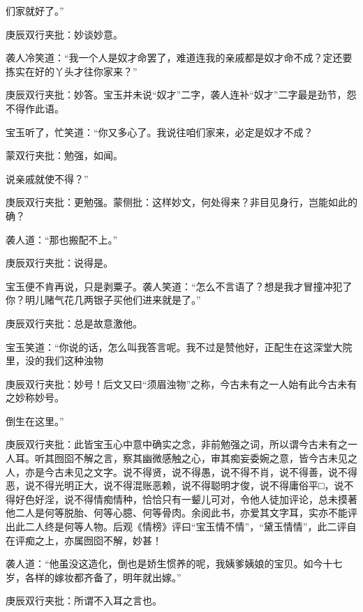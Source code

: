 \begin{parag}
们家就好了。”\begin{note}庚辰双行夹批：妙谈妙意。\end{note}袭人冷笑道：“我一个人是奴才命罢了，难道连我的亲戚都是奴才命不成？定还要拣实在好的丫头才往你家来？”\begin{note}庚辰双行夹批：妙答。宝玉并未说“奴才”二字，袭人连补“奴才”二字最是劲节，怨不得作此语。\end{note}宝玉听了，忙笑道：“你又多心了。我说往咱们家来，必定是奴才不成？\begin{note}蒙双行夹批：勉强，如闻。\end{note}说亲戚就使不得？”\begin{note}庚辰双行夹批：更勉强。蒙侧批：这样妙文，何处得来？非目见身行，岂能如此的确？\end{note}袭人道：“那也搬配不上。”\begin{note}庚辰双行夹批：说得是。\end{note}宝玉便不肯再说，只是剥粟子。袭人笑道：“怎么不言语了？想是我才冒撞冲犯了你？明儿赌气花几两银子买他们进来就是了。”\begin{note}庚辰双行夹批：总是故意激他。\end{note}宝玉笑道：“你说的话，怎么叫我答言呢。我不过是赞他好，正配生在这深堂大院里，没的我们这种浊物\begin{note}庚辰双行夹批：妙号！后文又曰“须眉浊物”之称，今古未有之一人始有此今古未有之妙称妙号。\end{note}倒生在这里。”\begin{note}庚辰双行夹批：此皆宝玉心中意中确实之念，非前勉强之词，所以谓今古未有之一人耳。听其囫囵不解之言，察其幽微感触之心，审其痴妄委婉之意，皆今古未见之人，亦是今古未见之文字。说不得贤，说不得愚，说不得不肖，说不得善，说不得恶，说不得光明正大，说不得混账恶赖，说不得聪明才俊，说不得庸俗平□，说不得好色好淫，说不得情痴情种，恰恰只有一颦儿可对，令他人徒加评论，总未摸著他二人是何等脱胎、何等心臆、何等骨肉。余阅此书，亦爱其文字耳，实亦不能评出此二人终是何等人物。后观《情榜》评曰“宝玉情不情”，“黛玉情情”，此二评自在评痴之上，亦属囫囵不解，妙甚！\end{note}袭人道：“他虽没这造化，倒也是娇生惯养的呢，我姨爹姨娘的宝贝。如今十七岁，各样的嫁妆都齐备了，明年就出嫁。”\begin{note}庚辰双行夹批：所谓不入耳之言也。\end{note}
\end{parag}


